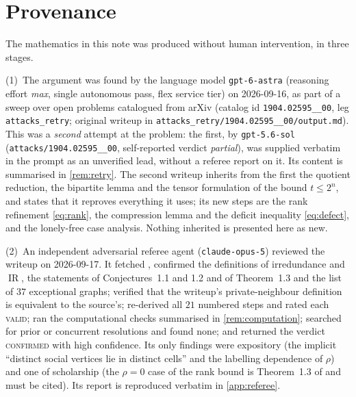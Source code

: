 \documentclass[11pt,a4paper]{article}
\theoremstyle{plain}
\theoremstyle{definition}
\theoremstyle{remark}
\newcommand{\IR}{\operatorname{IR}}
\newcommand{\rk}{\rho}
\begin{document}
\section{Provenance}\label{sec:provenance}

The mathematics in this note was produced without human intervention, in three stages.

(1)~The argument was found by the language model \texttt{gpt-6-astra} (reasoning effort \emph{max}, single autonomous pass, flex service tier) on 2026-09-16, as part of a sweep over open problems catalogued from arXiv (catalog id \texttt{1904.02595\_\_00}, leg \texttt{attacks\_retry}; original writeup in \nolinkurl{attacks_retry/1904.02595__00/output.md}). This was a \emph{second} attempt at the problem: the first, by \texttt{gpt-5.6-sol} (\texttt{attacks/1904.02595\_\_00}, self-reported verdict \emph{partial}), was supplied verbatim in the prompt as an unverified lead, without a referee report on it. Its content is summarised in \cref{rem:retry}. The second writeup inherits from the first the quotient reduction, the bipartite lemma and the tensor formulation of the bound $t\le2^n$, and states that it reproves everything it uses; its new steps are the rank refinement \eqref{eq:rank}, the compression lemma and the deficit inequality \eqref{eq:defect}, and the lonely-free case analysis. Nothing inherited is presented here as new.

(2)~An independent adversarial referee agent (\texttt{claude-opus-5}) reviewed the writeup on 2026-09-17. It fetched \cite{AD20}, confirmed the definitions of irredundance and $\IR$, the statements of Conjectures~1.1 and 1.2 and of Theorem~1.3 and the list of $37$ exceptional graphs; verified that the writeup's private-neighbour definition is equivalent to the source's; re-derived all $21$ numbered steps and rated each \textsc{valid}; ran the computational checks summarised in \cref{rem:computation}; searched for prior or concurrent resolutions and found none; and returned the verdict \textsc{confirmed} with high confidence. Its only findings were expository (the implicit ``distinct social vertices lie in distinct cells'' and the labelling dependence of $\rk$) and one of scholarship (the $\rk=0$ case of the rank bound is Theorem~1.3 of \cite{AD20} and must be cited). Its report is reproduced verbatim in \cref{app:referee}.
\end{document}
